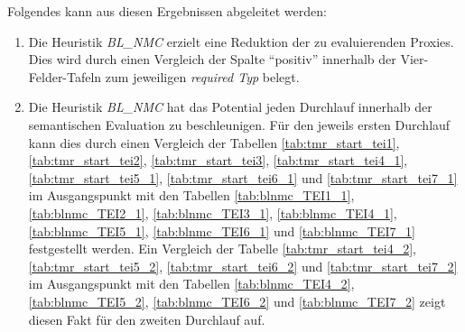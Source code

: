 Folgendes kann aus diesen Ergebnissen abgeleitet werden:
\begin{enumerate}
\item Die Heuristik \emph{BL\_NMC} erzielt eine Reduktion der zu evaluierenden Proxies. Dies wird durch einen Vergleich der Spalte ``positiv'' innerhalb der Vier-Felder-Tafeln zum jeweiligen \emph{required Typ} belegt.

\item Die Heuristik \emph{BL\_NMC} hat das Potential jeden Durchlauf innerhalb der semantischen Evaluation zu beschleunigen. Für den jeweils ersten Durchlauf kann dies durch einen Vergleich der Tabellen \ref{tab:tmr_start_tei1}, \ref{tab:tmr_start_tei2}, \ref{tab:tmr_start_tei3}, \ref{tab:tmr_start_tei4_1}, \ref{tab:tmr_start_tei5_1}, \ref{tab:tmr_start_tei6_1} und \ref{tab:tmr_start_tei7_1} im Ausgangspunkt mit den Tabellen \ref{tab:blnmc_TEI1_1}, \ref{tab:blnmc_TEI2_1}, \ref{tab:blnmc_TEI3_1}, \ref{tab:blnmc_TEI4_1}, \ref{tab:blnmc_TEI5_1}, \ref{tab:blnmc_TEI6_1} und \ref{tab:blnmc_TEI7_1} festgestellt werden. Ein Vergleich der Tabelle \ref{tab:tmr_start_tei4_2}, \ref{tab:tmr_start_tei5_2}, \ref{tab:tmr_start_tei6_2} und \ref{tab:tmr_start_tei7_2} im Ausgangspunkt mit den Tabellen \ref{tab:blnmc_TEI4_2}, \ref{tab:blnmc_TEI5_2}, \ref{tab:blnmc_TEI6_2} und \ref{tab:blnmc_TEI7_2} zeigt diesen Fakt für den zweiten Durchlauf auf.
\end{enumerate}
